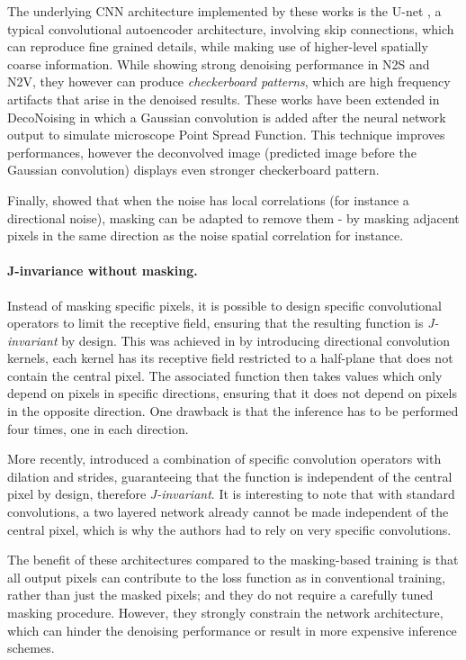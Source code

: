 \documentclass{article}
\begin{document}
The underlying CNN architecture implemented by these works is the U-net \cite{ronneberger2015u}, a typical convolutional autoencoder architecture, involving skip connections, which can reproduce fine grained details, while making use of higher-level spatially coarse information. While showing strong denoising performance in N2S and N2V, they however can produce \textit{checkerboard patterns}, which are high frequency artifacts that arise in the denoised results.
These works have been extended in DecoNoising \cite{goncharova2020} in which a Gaussian convolution is added after the neural network output to simulate microscope Point Spread Function.
This technique improves performances, however the deconvolved image (predicted image before the Gaussian convolution) displays even stronger checkerboard pattern.

Finally, \cite{broaddus2020removing} showed that when the noise has local correlations (for instance a  directional noise),  masking can be adapted to remove them - by masking adjacent pixels in the same direction as the noise spatial correlation for instance.

\paragraph{J-invariance without masking.}
Instead of masking specific pixels, it is possible to design specific convolutional operators to limit the receptive field, ensuring that the resulting function is \textit{J-invariant} by design. This was achieved in \cite{laine2019high} by introducing directional convolution kernels, each kernel has its receptive field restricted to a half-plane that does not contain the central pixel. The associated function then takes values which only depend on pixels in specific directions, ensuring that it does not depend on pixels in the opposite direction. One drawback is that the inference has to be performed four times, one in each direction.

More recently, \cite{lee2020noise2kernel} introduced a combination of specific convolution operators with dilation and strides, guaranteeing that the function is independent of the central pixel by design, therefore \textit{J-invariant}. It is interesting to note that with standard convolutions, a two layered network already cannot be made independent of the central pixel, which is why the authors had to rely on very specific convolutions.

The benefit of these architectures compared to the masking-based training is that all output pixels can contribute to the loss function as in conventional training, rather than just the masked pixels; and they do not require a carefully tuned masking procedure. However, they strongly constrain the network architecture, which can hinder the denoising performance or result in more expensive inference schemes.
\end{document}
